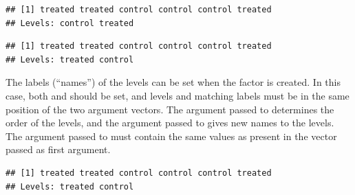 \documentclass[krantz2]{krantz}\usepackage{knitr}%
\begin{document}
\begin{knitrout}\footnotesize
{}\color{fgcolor}\begin{kframe}
\begin{alltt}
 \hlkwb{<-} \hlstd{(}\hlstd{,} \hlstd{,} \hlstd{,} \hlstd{,} \hlstd{,} \hlstd{)}
 \hlkwb{<-} 
\end{alltt}
\begin{verbatim}
## [1] treated treated control control control treated
## Levels: control treated
\end{verbatim}
\begin{alltt}
 \hlkwb{<-} \hlstd{(}   \hlstd{=} \hlstd{(}\hlstd{,} \hlstd{))}
\end{alltt}
\begin{verbatim}
## [1] treated treated control control control treated
## Levels: treated control
\end{verbatim}
\end{kframe}
\end{knitrout}

The labels (``names'') of the levels can be set when the factor is created. In this case, both  and  should be set, and levels and matching labels must be in the same position of the two argument vectors. The argument passed to  determines the order of the levels, and the argument passed to  gives new names to the levels. The argument passed to  must contain the same values as present in the vector passed as first argument.

\begin{knitrout}\footnotesize
{}\color{fgcolor}\begin{kframe}
\begin{alltt}
 \hlkwb{<-} \hlstd{(}\hlstd{,} \hlstd{,} \hlstd{,} \hlstd{,} \hlstd{,} \hlstd{)}
 \hlkwb{<-} \hlstd{(}   \hlstd{=} \hlstd{(}\hlstd{,} \hlstd{),}  \hlstd{=} \hlstd{(}\hlstd{,} \hlstd{))}
\end{alltt}
\begin{verbatim}
## [1] treated treated control control control treated
## Levels: treated control
\end{verbatim}
\end{kframe}
\end{knitrout}
\end{document}
